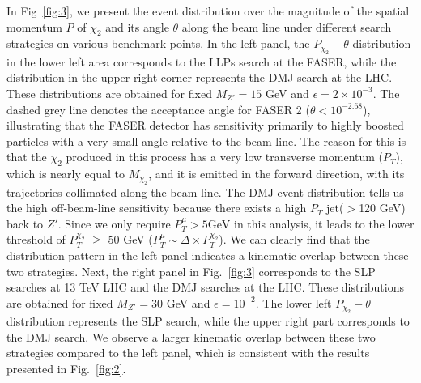 \documentclass[preprint, superscriptaddress,amsmath, nofootinbib]{revtex4-1}
\begin{document}
In Fig~\ref{fig:3}, we present the event distribution over the magnitude of the spatial momentum $P$ of $\chi_2$ and its angle $\theta$ along the beam line under different search strategies on various benchmark points. In the left panel, the $P_{\chi_2}-\theta$ distribution in the lower left area corresponds to the LLPs search at the FASER, while the distribution in the upper right corner represents the DMJ search at the LHC. These distributions are obtained for fixed $M_{Z'} = 15$ GeV and $\epsilon = 2 \times 10^{-3}$. The dashed grey line denotes the acceptance angle for FASER 2 ($\theta < 10^{-2.68}$), illustrating that the FASER detector has sensitivity primarily to highly boosted particles with a very small angle relative to the beam line. The reason for this is that the $\chi_2$ produced in this process has a very low transverse momentum ($P_T$), which is nearly equal to $M_{\chi_2}$, and it is emitted in the forward direction, with its trajectories collimated along the beam-line. The DMJ event distribution tells us the high off-beam-line sensitivity because there exists a high $P_T$ jet($>$120 GeV) back to $Z'$. Since we only require $P_T^{\mu} > 5 \text{GeV}$ in this analysis, it leads to the lower threshold of $P_{T}^{\chi_2}$ $\geq$ 50 GeV ($P_T^{\mu} \sim \Delta \times P_{T}^{\chi_2}$). We can clearly find that the distribution pattern in the left panel indicates a kinematic overlap between these two strategies. Next, the right panel in Fig.~\ref{fig:3} corresponds to the SLP searches at 13 TeV LHC and the DMJ searches at the LHC. These distributions are obtained for fixed $M_{Z'} = 30$ GeV and $\epsilon = 10^{-2}$. The lower left $P_{\chi_2}-\theta$ distribution represents the SLP search, while the upper right part corresponds to the DMJ search. 
 We observe a larger kinematic overlap between these two strategies compared to the left panel, which is consistent with the results presented in Fig.~\ref{fig:2}.
\end{document}
